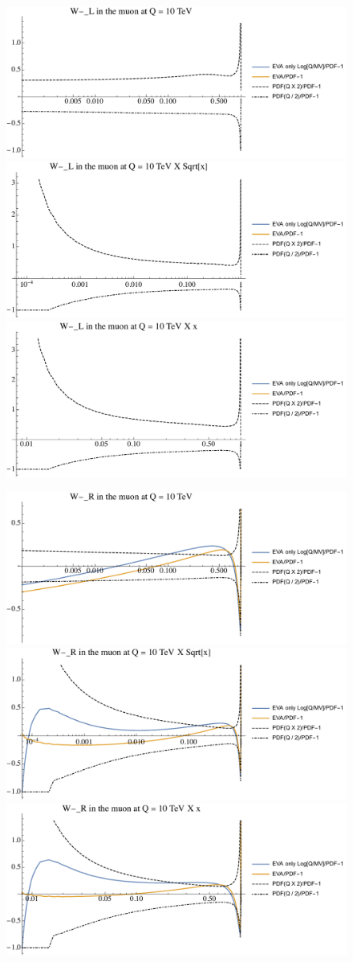 \documentclass[a4paper,11pt]{article}
\begin{document}
\begin{figure}[ht]
\includegraphics[width=0.4\linewidth]{PlotPDFs/ratios/10TeV/W-_L_Q.pdf}
\includegraphics[width=0.4\linewidth]{PlotPDFs/ratios/10TeV/W-_L_Qsqrtx.pdf}
\includegraphics[width=0.4\linewidth]{PlotPDFs/ratios/10TeV/W-_L_Qx.pdf}
\end{figure}

\begin{figure}[ht]
\includegraphics[width=0.4\linewidth]{PlotPDFs/ratios/10TeV/W-_R_Q.pdf}
\includegraphics[width=0.4\linewidth]{PlotPDFs/ratios/10TeV/W-_R_Qsqrtx.pdf}
\includegraphics[width=0.4\linewidth]{PlotPDFs/ratios/10TeV/W-_R_Qx.pdf}
\end{figure}
\end{document}
